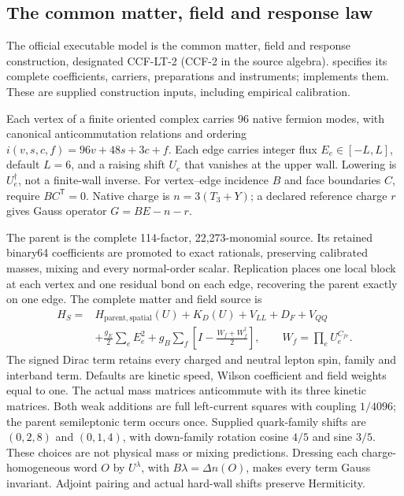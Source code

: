\subsection{The common matter, field and response law}
\label{sec:common-matter-field-response}

The official executable model is the common matter, field and response
construction, designated CCF-LT-2 (CCF-2 in the source algebra).
 specifies its complete coefficients, carriers,
preparations and instruments;  implements them.
These are supplied construction inputs, including empirical calibration.

Each vertex of a finite oriented complex carries 96 native fermion modes,
with canonical anticommutation relations and ordering
$i(v,s,c,f)=96v+48s+3c+f$. Each edge carries integer flux
$E_e\in[-L,L]$, default $L=6$, and a raising shift $U_e$ that vanishes
at the upper wall. Lowering is $U_e^\dagger$, not a finite-wall inverse.
For vertex--edge incidence $B$ and face boundaries $C$, require
$BC^{\mathsf T}=0$. Native charge is $n=3(T_3+Y)$; a declared reference
charge $r$ gives Gauss operator $G=BE-n-r$.

The parent is the complete 114-factor, 22,273-monomial source. Its retained
binary64 coefficients are promoted to exact rationals, preserving calibrated
masses, mixing and every normal-order scalar. Replication places one local
block at each vertex and one residual bond on each edge, recovering the
parent exactly on one edge. The complete matter and field source is
\begin{align}
 H_S={}&H_{\mathrm{parent,spatial}}(U)+K_D(U)+V_{LL}+D_F+V_{QQ}
 \nonumber\\
 &+\frac{g_E}{2}\sum_eE_e^2
   +g_B\sum_f\left[I-\frac{W_f+W_f^\dagger}{2}\right],
 \qquad W_f=\prod_eU_e^{C_{fe}}.\label{eq:common-source-law}
\end{align}
The signed Dirac term retains every charged and neutral lepton spin,
family and interband term. Defaults are kinetic speed, Wilson coefficient
and field weights equal to one. The actual mass matrices anticommute
with its three kinetic matrices. Both weak additions are full left-current
squares with coupling $1/4096$; the parent semileptonic term occurs once.
Supplied quark-family shifts are $(0,2,8)$ and $(0,1,4)$, with down-family
rotation cosine $4/5$ and sine $3/5$. These choices are not physical mass
or mixing predictions. Dressing each charge-homogeneous word $O$ by
$U^\lambda$, with $B\lambda=\Delta n(O)$, makes every term Gauss
invariant. Adjoint pairing and actual hard-wall shifts preserve Hermiticity.

